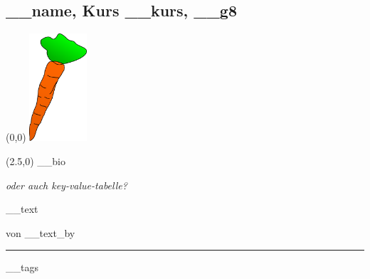 \subsection*{__name, Kurs __kurs, __g8}
\begin{textblock}{2.5}(0,0)
	\noindent\mbox{\includegraphics[height=4cm ]{karotte2.png}} %
\end{textblock}

\begin{textblock}{10}(2.5,0)
	\setlength{\parindent}{0cm}
	__bio
	
	{\em oder auch key-value-tabelle?}
\end{textblock}

\vspace{4.5cm}
__text

\vspace{3mm}
von __text_by
\vfill
\hrule
\vspace{2mm}
{\small
__tags
}

\newpage
